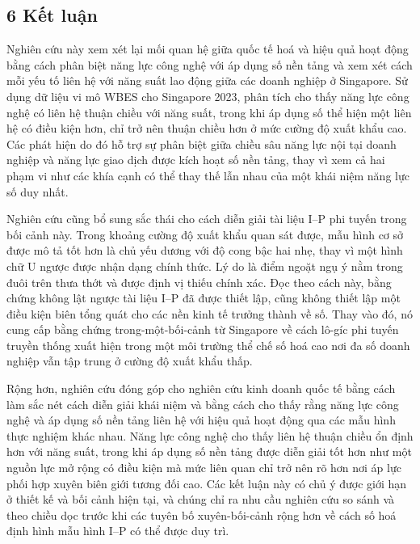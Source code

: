 \documentclass[12pt,a4paper]{article}
\begin{document}
\hypertarget{6-kux1ebft-luux1eadn}{%
\subsection{6 Kết luận}\label{6-kux1ebft-luux1eadn}}

Nghiên cứu này xem xét lại mối quan hệ giữa quốc tế hoá và hiệu quả hoạt
động bằng cách phân biệt năng lực công nghệ với áp dụng số nền tảng và
xem xét cách mỗi yếu tố liên hệ với năng suất lao động giữa các doanh
nghiệp ở Singapore. Sử dụng dữ liệu vi mô WBES cho Singapore 2023, phân
tích cho thấy năng lực công nghệ có liên hệ thuận chiều với năng suất,
trong khi áp dụng số thể hiện một liên hệ có điều kiện hơn, chỉ trở nên
thuận chiều hơn ở mức cường độ xuất khẩu cao. Các phát hiện do đó hỗ trợ
sự phân biệt giữa chiều sâu năng lực nội tại doanh nghiệp và năng lực
giao dịch được kích hoạt số nền tảng, thay vì xem cả hai phạm vi như các
khía cạnh có thể thay thế lẫn nhau của một khái niệm năng lực số duy
nhất.

Nghiên cứu cũng bổ sung sắc thái cho cách diễn giải tài liệu I--P phi
tuyến trong bối cảnh này. Trong khoảng cường độ xuất khẩu quan sát được,
mẫu hình cơ sở được mô tả tốt hơn là chủ yếu dương với độ cong bậc hai
nhẹ, thay vì một hình chữ U ngược được nhận dạng chính thức. Lý do là
điểm ngoặt ngụ ý nằm trong đuôi trên thưa thớt và được định vị thiếu
chính xác. Đọc theo cách này, bằng chứng không lật ngược tài liệu I--P
đã được thiết lập, cũng không thiết lập một điều kiện biên tổng quát cho
các nền kinh tế trưởng thành về số. Thay vào đó, nó cung cấp bằng chứng
trong-một-bối-cảnh từ Singapore về cách lô-gíc phi tuyến truyền thống
xuất hiện trong một môi trường thể chế số hoá cao nơi đa số doanh nghiệp
vẫn tập trung ở cường độ xuất khẩu thấp.

Rộng hơn, nghiên cứu đóng góp cho nghiên cứu kinh doanh quốc tế bằng
cách làm sắc nét cách diễn giải khái niệm và bằng cách cho thấy rằng
năng lực công nghệ và áp dụng số nền tảng liên hệ với hiệu quả hoạt động
qua các mẫu hình thực nghiệm khác nhau. Năng lực công nghệ cho thấy liên
hệ thuận chiều ổn định hơn với năng suất, trong khi áp dụng số nền tảng
được diễn giải tốt hơn như một nguồn lực mở rộng có điều kiện mà mức
liên quan chỉ trở nên rõ hơn nơi áp lực phối hợp xuyên biên giới tương
đối cao. Các kết luận này có chủ ý được giới hạn ở thiết kế và bối cảnh
hiện tại, và chúng chỉ ra nhu cầu nghiên cứu so sánh và theo chiều dọc
trước khi các tuyên bố xuyên-bối-cảnh rộng hơn về cách số hoá định hình
mẫu hình I--P có thể được duy trì.
\end{document}
